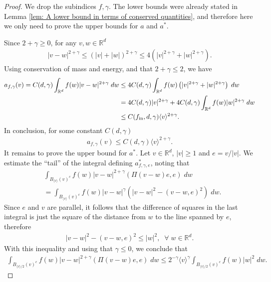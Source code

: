 \documentclass[12pt,american]{amsart}
\numberwithin{equation}{section}
\theoremstyle{plain}
\theoremstyle{definition}                  %
\def\astar{{a^*}}
\def\fin{f_{\textnormal{in}}}
\begin{document}
\begin{proof}
  We drop the subindices $f,\gamma$. The lower bounds were already stated in Lemma \ref{lem: A lower bound in terms of conserved quantities}, and therefore here we only need to prove the upper bounds for $a$ and $\astar$. 
  
  Since $2+\gamma\geq 0$, for any $v,w\in\mathbb{R}^d$
  \begin{align*}
    |v-w|^{2+\gamma} \leq \left ( |v|+|w| \right )^{2+\gamma} \leq 4 \left ( |v|^{2+\gamma}+|w|^{2+\gamma}\right ).
  \end{align*}
  Using conservation of mass and energy, and that $2+\gamma\leq 2$, we have 
  \begin{align*}
    a_{f,\gamma}(v) = C(d,\gamma)\int_{\mathbb{R}^d} f(w)|v-w|^{2+\gamma}\;dw & \leq 4C(d,\gamma)\int_{\mathbb{R}^d}f(w)\left( |v|^{2+\gamma}+|w|^{2+\gamma} \right )\;dw\\
	  & = 4C(d,\gamma)|v|^{2+\gamma}+4C(d,\gamma)\int_{\mathbb{R}^d}f(w)|w|^{2+\gamma}\;dw\\
	  & \le C(\fin,d,\gamma) \langle v\rangle^{2+\gamma}.
  \end{align*}
  In conclusion, for some constant $C(d,\gamma)$
  \begin{align*}
    a_{f,\gamma}(v) \leq  C(d,\gamma)\langle v\rangle^{2+\gamma}.
  \end{align*}
  It remains to prove the upper bound for $\astar$. Let $v\in\mathbb{R}^d$, $|v|\geq 1$ and $e = {v}/|v|$. We estimate the ``tail'' of the integral defining $a^*_{f,\gamma,e}$, noting that
  \begin{align*}
    & \int_{B_{\langle v\rangle}(v)^c}f(w)|v-w|^{2+\gamma}(\Pi(v-w)e,e)\;dw\\
    & = \int_{B_{\langle v\rangle}(v)^c}f(w)|v-w|^{\gamma}(|v-w|^2-(v-w,e)^2 )\;dw.  		  
  \end{align*}	  
  Since $e$ and $v$ are parallel, it follows that the difference of squares in the last integral is just the square of the distance from $w$ to the line spanned by $e$, therefore
  \begin{align*}
      |v-w|^2-(v-w,e)^2 \leq |w|^2,\;\;\forall\;w\in\mathbb{R}^d.
  \end{align*}
  With this inequality and using that $\gamma\leq 0$, we conclude that
  \begin{align*}
    \int_{B_{\langle v\rangle/2}(v)^c}f(w)|v-w|^{2+\gamma}(\Pi(v-w)e,e)\;dw \leq 2^{-\gamma}\langle v\rangle^\gamma \int_{B_{\langle v\rangle/2}(v)^c}f(w)|w|^2\;dw.  		  
  \end{align*}	  

\end{proof}
\end{document}
